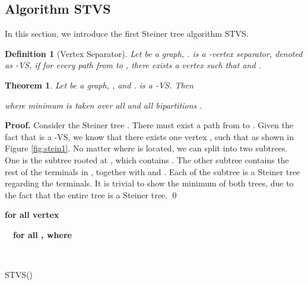 \documentclass[preprint,12pt]{elsarticle}
\newtheorem{theorem}{Theorem}
\newtheorem{definition}{Definition}
\newenvironment{proof}{\begin{trivlist}\item[]\textbf{Proof.}}{\end{trivlist}}
\begin{document}
\subsection{Algorithm STVS}
\label{sec:stvs}

In this section, we introduce the first Steiner tree algorithm STVS.


\begin{definition} [Vertex Separator]
Let  be a graph, .  is a 
-vertex separator, denoted as -VS, if for every path  from  to ,
there exists a vertex  such that  and .
\end{definition}

\begin{theorem}
Let  be a graph, ,  and .
 is a -VS. Then 

where minimum is taken over all  and all  bipartitions
.
\label{the:stvs}
\end{theorem}


\begin{figure}[ht]
 \centering
{}
\end{figure}





\begin{proof}
Consider the Steiner tree .
There must exist a path  from  to .
Given the fact that  is a -VS, 
we know that there exists one vertex , such that  as shown in Figure \ref{fig:stein1}.
No matter where  is located, we can split 
into two subtrees. One is the subtree rooted at , which contains .
The other subtree contains
the rest of the terminals in , together with  and . 
Each of the subtree is a Steiner tree regarding the terminals. 
It is trivial to show the minimum of both trees, due to the fact that
the entire tree is a Steiner tree. \qed
\end{proof}


\begin{algorithm}
\begin{algorithmic}
\ENSURE{}

\bf{for all} {vertex   }

~~\bf{for all} {,  where  }

~~~~~~ {}
\RETURN {}
\end{algorithmic}
\caption{STVS()}
\label{alg:stvs}
\end{algorithm}
\end{document}
